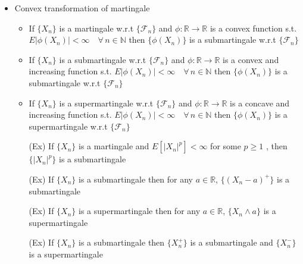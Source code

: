 \documentclass[12pt, A4]{article}
\newcommand{\N}{\mathbb{N}}
\newcommand{\R}{\mathbb{R}}
\newcommand{\F}{\mathcal{F}}
\newcommand{\foranyn}{\quad \forall \, n\in \N}
\begin{document}
\begin{itemize}
\begin{itemize}
	\end{itemize}
\clearpage
	\item Convex transformation of martingale
	\begin{itemize}
		\item If $\{X_n\}$ is a martingale w.r.t $\{\F_n\}$ and $\phi:\R\rightarrow \R$ is a convex function s.t. \\$E|\phi(X_n)|<\infty\foranyn$ then $\{\phi(X_n)\}$ is a submartingale w.r.t $\{\F_n\}$
		\item If $\{X_n\}$ is a submartingale w.r.t $\{\F_n\}$ and $\phi:\R\rightarrow \R$ is a convex and increasing function s.t. $E|\phi(X_n)|<\infty\foranyn$ then $\{\phi(X_n)\}$ is a submartingale w.r.t $\{\F_n\}$
		\item If $\{X_n\}$ is a supermartingale w.r.t $\{\F_n\}$ and $\phi:\R\rightarrow \R$ is a concave and increasing function s.t. $E|\phi(X_n)|<\infty\foranyn$ then $\{\phi(X_n)\}$ is a supermartingale w.r.t $\{\F_n\}$
		\item[(Ex)] If $\{X_n\}$ is a martingale and $E[|X_n|^p]<\infty$ for some $p\geq1$ , then $\{|X_n|^p\}$ is a submartingale
		\item[(Ex)] If $\{X_n\}$ is a submartingale then for any $a\in \R$, $\{(X_n-a)^+\}$ is a submartingale 
		\item[(Ex)] If $\{X_n\}$ is a supermartingale then for any $a\in \R$, $\{X_n\wedge a\}$ is a supermartingale
		\item[(Ex)] If $\{X_n\}$ is a submartingale then $\{X_n^+\}$ is a submartingale and $\{X_n^-\}$ is a supermartingale
	\end{itemize}


\end{itemize}
\end{document}
